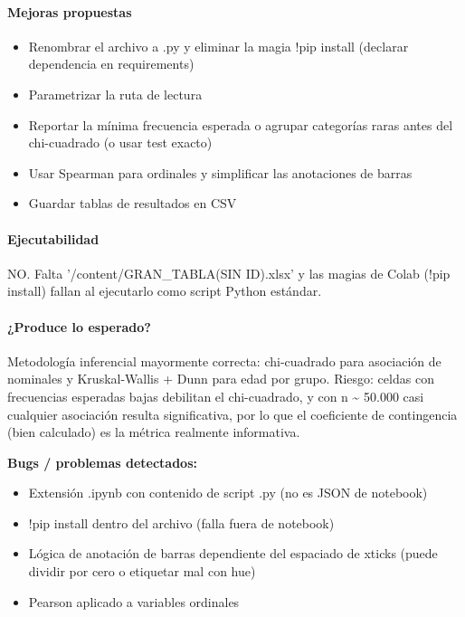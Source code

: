 \paragraph{Mejoras propuestas}
\begin{itemize}
  \item Renombrar el archivo a .py y eliminar la magia !pip install (declarar dependencia en requirements)
  \item Parametrizar la ruta de lectura
  \item Reportar la mínima frecuencia esperada o agrupar categorías raras antes del chi-cuadrado (o usar test exacto)
  \item Usar Spearman para ordinales y simplificar las anotaciones de barras
  \item Guardar tablas de resultados en CSV
\end{itemize}

\paragraph{Ejecutabilidad}
NO. Falta '/content/GRAN\_TABLA(SIN ID).xlsx' y las magias de Colab (!pip install) fallan al ejecutarlo como script Python estándar.

\paragraph{¿Produce lo esperado?}
Metodología inferencial mayormente correcta: chi-cuadrado para asociación de nominales y Kruskal-Wallis + Dunn para edad por grupo. Riesgo: celdas con frecuencias esperadas bajas debilitan el chi-cuadrado, y con n \textasciitilde{} 50.000 casi cualquier asociación resulta significativa, por lo que el coeficiente de contingencia (bien calculado) es la métrica realmente informativa.

\begin{tcolorbox}[riesgo]
\textbf{Bugs / problemas detectados:}
\begin{itemize}
  \item Extensión .ipynb con contenido de script .py (no es JSON de notebook)
  \item !pip install dentro del archivo (falla fuera de notebook)
  \item Lógica de anotación de barras dependiente del espaciado de xticks (puede dividir por cero o etiquetar mal con hue)
  \item Pearson aplicado a variables ordinales
\end{itemize}
\end{tcolorbox}

